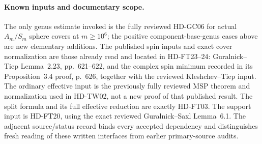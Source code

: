 \paragraph{Known inputs and documentary scope.}
The only genus estimate invoked is the fully reviewed HD-GC06
for actual $A_m/S_m$ sphere covers at $m\ge10^6$; the positive
component-base-genus cases above are new elementary additions.
The published spin inputs and exact cover normalization are
those already read and located in HD-FT23--24:
Guralnick--Tiep Lemma~2.23, pp.~621--622, and the complex spin
minimum recorded in its Proposition~3.4 proof, p.~626, together
with the reviewed Kleshchev--Tiep input.\cite{HD:GT2012,HD:KT2004}
The ordinary effective input is the previously fully reviewed
MSP theorem and normalization used in HD-TW02, not a new proof
of that published result.\cite{HD:MSP2007,HD:MullerSLC2006}
The split formula and its full effective reduction are exactly
HD-FT03.  The support input is HD-FT20, using the exact reviewed
Guralnick--Saxl Lemma~6.1.\cite{BI:GS}
The adjacent source/status record binds every accepted dependency
and distinguishes fresh reading of these written interfaces from
earlier primary-source audits.
